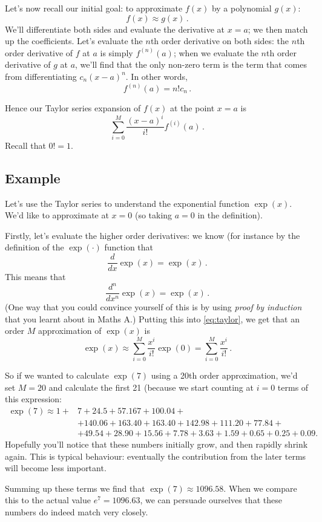 \documentclass[12pt]{article}
\begin{document}
Let's now recall our initial goal: to approximate $f(x)$ by a polynomial $g(x)$:
\[
f(x) \approx g(x)\,.
\]
We'll differentiate both sides and evaluate the derivative at $x=a$; we then match up the coefficients. Let's evaluate the $n$th order derivative on both sides: the $n$th order derivative of $f$ at $a$ is simply $f^{(n)}(a)$; when we evaluate the $n$th order derivative of $g$ at $a$, we'll find that the only non-zero term is the term that comes from differentiating $c_n(x-a)^n$. In other words, 
\[
f^{(n)}(a) =  n!c_n\,.
\]

Hence our Taylor series expansion of $f(x)$ at the point $x=a$ is 
\begin{equation}\label{eq:taylor}
\sum_{i=0}^M \frac{(x-a)^i}{i!}f^{(i)}(a)\,.
\end{equation}
Recall that $0! = 1$.

\subsection*{Example}
Let's use the Taylor series to understand the exponential function $\exp(x)$.  We'd like to approximate at $x=0$ (so taking $a=0$ in the definition).

Firstly, let's evaluate the higher order derivatives: we know (for instance by the definition of the $\exp(\cdot)$ function that
\[
\frac{d}{dx}\exp(x) = \exp(x)\,.
\]
This means that 
\[
\frac{d^{n}}{dx^n}\exp(x) = \exp(x)\,.
\]
(One way that you could convince yourself of this is by using \emph{proof by induction} that you learnt about in Maths A.)
Putting this into \eqref{eq:taylor}, we get that an order $M$ approximation of $\exp(x)$ is
\[
\exp(x)\approx \sum_{i=0}^M \frac{x^i}{i!}\exp(0)
= \sum_{i=0}^M \frac{x^i}{i!}\,.
\]

So if we wanted to calculate $\exp(7)$ using a 20th order approximation, we'd set $M=20$ and calculate the first 21 (because we start counting at $i=0$ terms of this expression:
\begin{align*}
\exp(7) \approx 1+ &7 + 24.5+ 57.167 + 100.04 + \\
&+ 140.06+163.40+163.40+142.98+111.20+77.84+\\
&  +49.54 +28.90 + 15.56 + 7.78 + 3.63 + 1.59  + 0.65 + 0.25 + 0.09.
\end{align*}
Hopefully you'll notice that these numbers initially grow, and then rapidly shrink again. This is typical behaviour: eventually the contribution from the later terms will become less important. 

Summing up these terms we find that $\exp(7) \approx 1096.58$. When we compare this to the actual value $e^7 = 1096.63$, we can  persuade ourselves that these numbers do indeed match very closely. 
\end{document}
